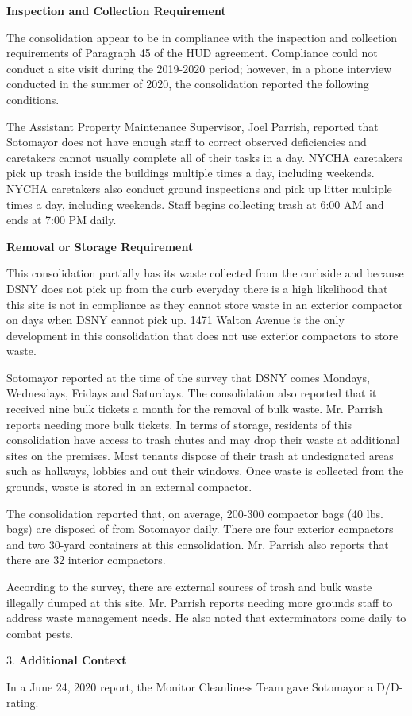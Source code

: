 
\textbf{Inspection and Collection Requirement}

The consolidation appear to be in compliance with the inspection and collection requirements of Paragraph 45 of the HUD agreement. Compliance could not conduct a site visit during the 2019-2020 period; however, in a phone interview conducted in the summer of 2020, the consolidation reported the following conditions.

The Assistant Property Maintenance Supervisor, Joel Parrish, reported that Sotomayor does not have enough staff to correct observed deficiencies and caretakers cannot usually complete all of their tasks in a day. NYCHA caretakers pick up trash inside the buildings multiple times a day, including weekends. NYCHA caretakers also conduct ground inspections and pick up litter multiple times a day, including weekends. Staff begins collecting trash at 6:00 AM and ends at 7:00 PM daily. 

\textbf{Removal or Storage Requirement}

This consolidation partially has its waste collected from the curbside and because DSNY does not pick up from the curb everyday there is a high likelihood that this site is not in compliance as they cannot store waste in an exterior compactor on days when DSNY cannot pick up. 1471 Walton Avenue is the only development in this consolidation that does not use exterior compactors to store waste.

Sotomayor reported at the time of the survey that DSNY comes Mondays, Wednesdays, Fridays and Saturdays. The consolidation also reported that it received nine bulk tickets a month for the removal of bulk waste. Mr. Parrish reports needing more bulk tickets. In terms of storage, residents of this consolidation have access to trash chutes and may drop their waste at additional sites on the premises. Most tenants dispose of their trash at undesignated areas such as hallways, lobbies and out their windows. Once waste is collected from the grounds, waste is stored in an external compactor. 

The consolidation reported that, on average, 200-300 compactor bags (40 lbs. bags) are disposed of from Sotomayor daily. There are four exterior compactors and two 30-yard containers at this consolidation. Mr. Parrish also reports that there are 32 interior compactors.

According to the survey, there are external sources of trash and bulk waste illegally dumped at this site.  Mr. Parrish reports needing more grounds staff to address waste management needs. He also noted that exterminators come daily to combat pests.

3. \textbf{Additional Context} 

In a June 24, 2020 report, the Monitor Cleanliness Team gave Sotomayor a D/D- rating. 